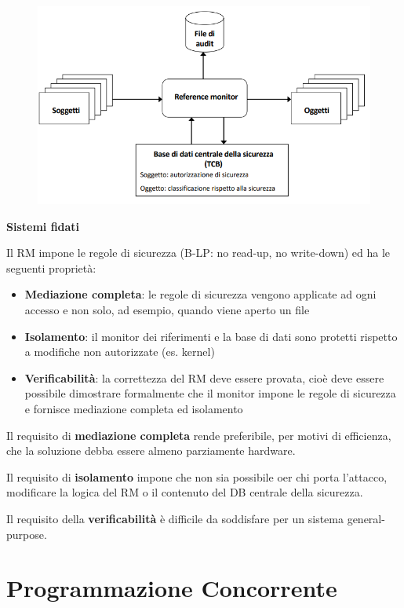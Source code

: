 \documentclass{article}
\begin{document}
\begin{figure}[htbp]
    \centering
    \includegraphics[width=0.70\columnwidth]{imgs/elevata_sicurezza.PNG}
\end{figure}

\vspace{3mm}
\textbf{Sistemi fidati}
\vspace{3mm}

Il RM impone le regole di sicurezza (B-LP: no read-up, no write-down) ed ha le seguenti proprietà:
\begin{itemize}
    \item \textbf{Mediazione completa}: le regole di sicurezza vengono applicate ad ogni accesso e non solo, ad esempio, quando viene aperto un file
    \item \textbf{Isolamento}: il monitor dei riferimenti e la base di dati sono protetti rispetto a modifiche non autorizzate (es. kernel)
    \item \textbf{Verificabilità}: la correttezza del RM deve essere provata, cioè deve essere possibile dimostrare formalmente che il monitor impone le regole
    di sicurezza e fornisce mediazione completa ed isolamento
\end{itemize}

\vspace{3mm}
Il requisito di \textbf{mediazione completa} rende preferibile, per motivi di efficienza, che la soluzione debba essere almeno parziamente hardware.

\vspace{3mm}
Il requisito di \textbf{isolamento} impone che non sia possibile oer chi porta l'attacco, modificare la logica del RM o il contenuto del DB centrale della sicurezza.

\vspace{3mm}
Il requisito della \textbf{verificabilità} è difficile da soddisfare per un sistema general-purpose.

\newpage

\section{Programmazione Concorrente}
\end{document}
